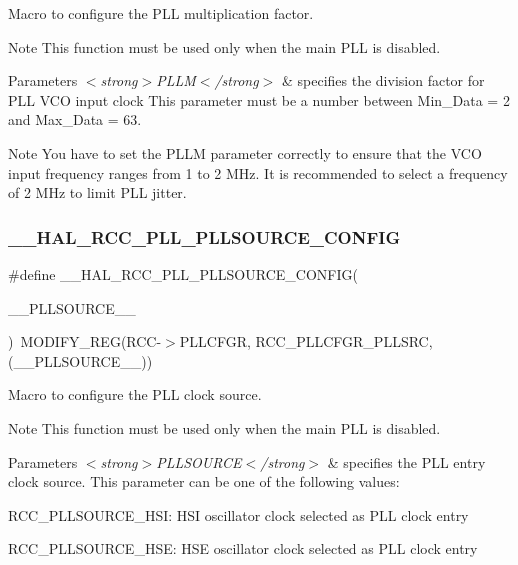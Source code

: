 Macro to configure the P\+LL multiplication factor. 

\begin{DoxyNote}{Note}
This function must be used only when the main P\+LL is disabled. 
\end{DoxyNote}

\begin{DoxyParams}{Parameters}
{\em $<$strong$>$\+P\+L\+L\+M$<$/strong$>$} & specifies the division factor for P\+LL V\+CO input clock This parameter must be a number between Min\+\_\+\+Data = 2 and Max\+\_\+\+Data = 63. \\
\hline
\end{DoxyParams}
\begin{DoxyNote}{Note}
You have to set the P\+L\+LM parameter correctly to ensure that the V\+CO input frequency ranges from 1 to 2 M\+Hz. It is recommended to select a frequency of 2 M\+Hz to limit P\+LL jitter. 
\end{DoxyNote}
\mbox{\label{group___r_c_c___p_l_l___configuration_gaf9a8466f991888332ec978dc92c62d7d}} 
\subsubsection{\texorpdfstring{\_\_HAL\_RCC\_PLL\_PLLSOURCE\_CONFIG}{\_\_HAL\_RCC\_PLL\_PLLSOURCE\_CONFIG}}
{\footnotesize\ttfamily \#define \+\_\+\+\_\+\+H\+A\+L\+\_\+\+R\+C\+C\+\_\+\+P\+L\+L\+\_\+\+P\+L\+L\+S\+O\+U\+R\+C\+E\+\_\+\+C\+O\+N\+F\+IG(\begin{DoxyParamCaption}\item[{}]{\+\_\+\+\_\+\+P\+L\+L\+S\+O\+U\+R\+C\+E\+\_\+\+\_\+ }\end{DoxyParamCaption})~M\+O\+D\+I\+F\+Y\+\_\+\+R\+EG(R\+CC-\/$>$P\+L\+L\+C\+F\+GR, R\+C\+C\+\_\+\+P\+L\+L\+C\+F\+G\+R\+\_\+\+P\+L\+L\+S\+RC, (\+\_\+\+\_\+\+P\+L\+L\+S\+O\+U\+R\+C\+E\+\_\+\+\_\+))}



Macro to configure the P\+LL clock source. 

\begin{DoxyNote}{Note}
This function must be used only when the main P\+LL is disabled. 
\end{DoxyNote}

\begin{DoxyParams}{Parameters}
{\em $<$strong$>$\+P\+L\+L\+S\+O\+U\+R\+C\+E$<$/strong$>$} & specifies the P\+LL entry clock source. This parameter can be one of the following values\+: \begin{DoxyItemize}
\item R\+C\+C\+\_\+\+P\+L\+L\+S\+O\+U\+R\+C\+E\+\_\+\+H\+SI\+: H\+SI oscillator clock selected as P\+LL clock entry \item R\+C\+C\+\_\+\+P\+L\+L\+S\+O\+U\+R\+C\+E\+\_\+\+H\+SE\+: H\+SE oscillator clock selected as P\+LL clock entry \end{DoxyItemize}
\\
\hline
\end{DoxyParams}
